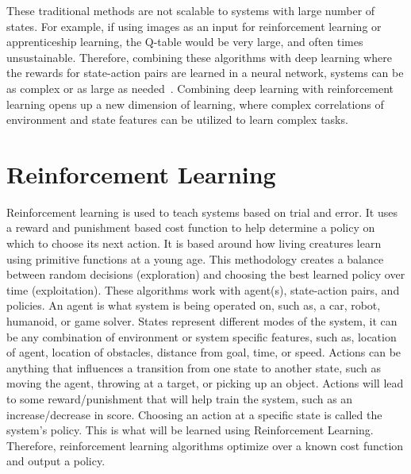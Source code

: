 \documentclass[12pt,american]{report}
\begin{document}
These traditional methods are not scalable to systems with large number of states.  For example, if using images as an input for reinforcement learning or apprenticeship learning, the Q-table would be very large, and often times unsustainable.  Therefore, combining these algorithms with deep learning where the rewards for state-action pairs are learned in a neural network, systems can be as complex or as large as needed~\cite{matiisen_2015}. Combining deep learning with reinforcement learning opens up a new dimension of learning, where complex correlations of environment and state features can be utilized to learn complex tasks.

\chapter{Reinforcement Learning}
Reinforcement learning is used to teach systems based on trial and error.  It uses a reward and punishment based cost function to help determine a policy on which to choose its next action.  It is based around how living creatures learn using primitive functions at a young age. This methodology creates a balance between random decisions (exploration) and choosing the best learned policy over time (exploitation). These algorithms work with agent(s), state-action pairs, and policies. An agent is what system is being operated on, such as, a car, robot, humanoid, or game solver. States represent different modes of the system, it can be any combination of environment or system specific features, such as, location of agent, location of obstacles, distance from goal, time, or speed. Actions can be anything that influences a transition from one state to another state, such as moving the agent, throwing at a target, or picking up an object.  Actions will lead to some reward/punishment that will help train the system, such as an increase/decrease in score.  Choosing an action at a specific state is called the system's policy. This is what will be learned using Reinforcement Learning.  Therefore, reinforcement learning algorithms optimize over a known cost function and output a policy.
		    
\end{document}
